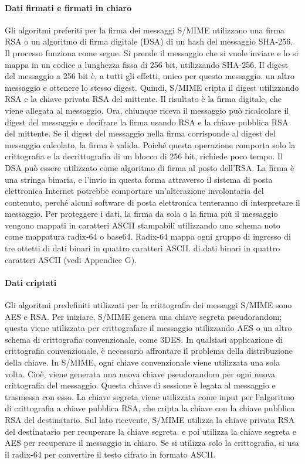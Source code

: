 \paragraph{Dati firmati e firmati in chiaro} Gli algoritmi preferiti per la firma dei messaggi S/MIME utilizzano una firma RSA o un algoritmo di firma digitale (DSA) di un hash del messaggio SHA-256. Il processo funziona come segue. Si prende il messaggio che si vuole inviare e lo si mappa in un codice a lunghezza fissa di 256 bit, utilizzando SHA-256. Il digest del messaggio a 256 bit è, a tutti gli effetti, unico per questo messaggio. un altro messaggio e ottenere lo stesso digest. Quindi, S/MIME cripta il digest utilizzando RSA e la chiave privata RSA del mittente. Il risultato è la firma digitale, che viene allegata al messaggio. Ora, chiunque riceva il messaggio può ricalcolare il digest del messaggio e decifrare la firma usando RSA e la chiave pubblica RSA del mittente. Se il digest del messaggio nella firma corrisponde al digest del messaggio calcolato, la firma è valida. Poiché questa operazione comporta solo la crittografia e la decrittografia di un blocco di 256 bit, richiede poco tempo. Il DSA può essere utilizzato come algoritmo di firma al posto dell'RSA. La firma è una stringa binaria, e l'invio in questa forma attraverso il sistema di posta elettronica Internet potrebbe comportare un'alterazione involontaria del contenuto, perché alcuni software di posta elettronica tenteranno di interpretare il messaggio. Per proteggere i dati, la firma da sola o la firma più il messaggio vengono mappati in caratteri ASCII stampabili utilizzando uno schema noto come mappatura radix-64 o base64. Radix-64 mappa ogni gruppo di ingresso di tre ottetti di dati binari in quattro caratteri ASCII. di dati binari in quattro caratteri ASCII (vedi Appendice G).

\singlespacing

\paragraph{Dati criptati} Gli algoritmi predefiniti utilizzati per la crittografia dei messaggi S/MIME sono
AES e RSA. Per iniziare, S/MIME genera una chiave segreta pseudorandom; questa viene utilizzata per crittografare il messaggio utilizzando AES o un altro schema di crittografia convenzionale, come 3DES. In qualsiasi applicazione di crittografia convenzionale, è necessario affrontare il problema della distribuzione della chiave. In S/MIME, ogni chiave convenzionale viene utilizzata una sola volta. Cioè, viene generata una nuova chiave pseudorandom per ogni nuova crittografia del messaggio. Questa chiave di sessione è legata al messaggio e trasmessa con esso. La chiave segreta viene utilizzata come input per l'algoritmo di crittografia a chiave pubblica RSA, che cripta la chiave con la chiave pubblica RSA del destinatario. Sul lato ricevente, S/MIME utilizza la chiave privata RSA del destinatario per recuperare la chiave segreta. e poi utilizza la chiave segreta e AES per recuperare il messaggio in chiaro. Se si utilizza solo la crittografia, si usa il radix-64 per convertire il testo cifrato in formato ASCII.

